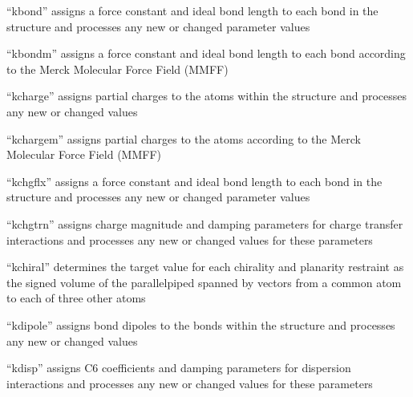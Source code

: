 \documentclass[letterpaper,11pt,english]{sphinxmanual}
\begin{document}
\sphinxAtStartPar
{}

\sphinxAtStartPar
“kbond” assigns a force constant and ideal bond length to each bond in the structure and processes any new or changed parameter values

\sphinxAtStartPar
{}

\sphinxAtStartPar
“kbondm” assigns a force constant and ideal bond length to each bond according to the Merck Molecular Force Field (MMFF)

\sphinxAtStartPar
{}

\sphinxAtStartPar
“kcharge” assigns partial charges to the atoms within the structure and processes any new or changed values

\sphinxAtStartPar
{}

\sphinxAtStartPar
“kchargem” assigns partial charges to the atoms according to the Merck Molecular Force Field (MMFF)

\sphinxAtStartPar
{}

\sphinxAtStartPar
“kchgflx” assigns a force constant and ideal bond length to each bond in the structure and processes any new or changed parameter values

\sphinxAtStartPar
{}

\sphinxAtStartPar
“kchgtrn” assigns charge magnitude and damping parameters for charge transfer interactions and processes any new or changed values for these parameters

\sphinxAtStartPar
{}

\sphinxAtStartPar
“kchiral” determines the target value for each chirality and planarity restraint as the signed volume of the parallelpiped spanned by vectors from a common atom to each of three other atoms

\sphinxAtStartPar
{}

\sphinxAtStartPar
“kdipole” assigns bond dipoles to the bonds within the structure and processes any new or changed values

\sphinxAtStartPar
{}

\sphinxAtStartPar
“kdisp” assigns C6 coefficients and damping parameters for dispersion interactions and processes any new or changed values for these parameters
\end{document}
